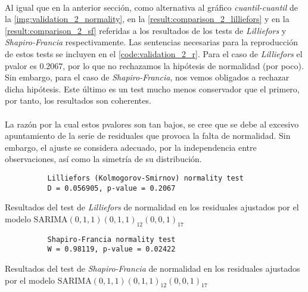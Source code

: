 \documentclass[a4paper, spanish]{article}
\begin{document}
      \paragraph{}
      Al igual que en la anterior sección, como alternativa al gráfico \emph{cuantil-cuantil} de la \autoref{img:validation_2_normality}, en la \autoref{result:comparison_2_lilliefors} y en la \autoref{result:comparison_2_sf} referidas a los resultados de los tests de \emph{Lilliefors} y \emph{Shapiro-Francia} respectivamente. Las sentencias necesarias para la reproducción de estos tests se incluyen en el \autoref{code:validation_2_r}. Para el caso de \emph{Lilliefors} el pvalor es $0.2067$, por lo que no rechazamos la hipótesis de normalidad (por poco). Sin embargo, para el caso de \emph{Shapiro-Francia}, nos vemos obligados a rechazar dicha hipótesis. Este último es un test mucho menos conservador que el primero, por tanto, los resultados son coherentes.

      \paragraph{}
      La razón por la cual estos pvalores son tan bajos, se cree que se debe al excesivo apuntamiento de la serie de residuales que provoca la falta de normalidad. Sin embargo, el  ajuste se considera adecuado, por la independencia entre observaciones, así como la simetría de su distribución.

      \begin{table}[htb!]
        \begin{Verbatim}
          Lilliefors (Kolmogorov-Smirnov) normality test
          D = 0.056905, p-value = 0.2067
        \end{Verbatim}
        \caption{Resultados del test de \emph{Lilliefors} de normalidad en los residuales ajustados por el modelo $\text{SARIMA}(0, 1, 1)(0, 1, 1)_{12}(0, 0, 1)_{17}$}
        \label{result:comparison_2_lilliefors}
      \end{table}

      \begin{table}[htb!]
        \begin{Verbatim}
          Shapiro-Francia normality test
          W = 0.98119, p-value = 0.02422
        \end{Verbatim}
        \caption{Resultados del test de \emph{Shapiro-Francia} de normalidad en los residuales ajustados por el modelo $\text{SARIMA}(0, 1, 1)(0, 1, 1)_{12}(0, 0, 1)_{17}$}
        \label{result:comparison_2_sf}
      \end{table}
\end{document}
